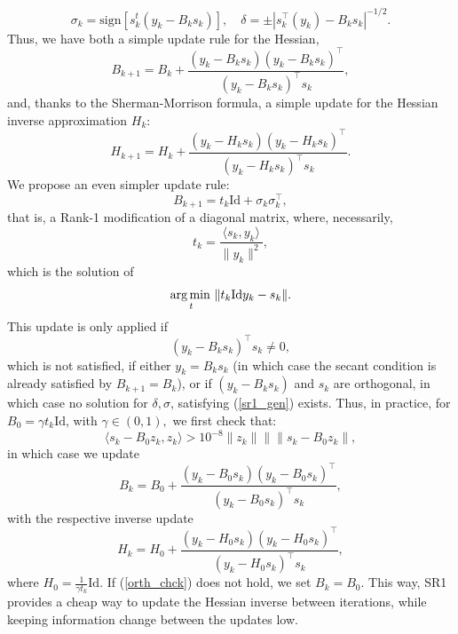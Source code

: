 \documentclass[11pt, twoside]{report}
\begin{document}
\[\sigma_k = \mathrm{sign}[s_k^t(y_k - B_k s_k)], \quad \delta = \pm |s_k^\top (y_k) - B_ks_k|^{-1/2}.\]
Thus, we have both a simple update rule for the Hessian,
\begin{equation} \label{sr1_upd}
    B_{k+1} = B_k + \frac{(y_k - B_ks_k)(y_k - B_ks_k)^\top}{(y_k - B_ks_k)^\top s_k},
\end{equation}
and, thanks to the Sherman-Morrison formula, a simple update for the Hessian inverse approximation $H_k$:
\begin{equation} \label{sr1_upd}
    H_{k+1} = H_k + \frac{(y_k - H_ks_k)(y_k - H_ks_k)^\top}{(y_k - H_ks_k)^\top s_k}.
\end{equation}
We propose an even simpler update rule:
\begin{equation} \label{sr1_poon}
    B_{k+1} = t_k \mathrm{Id} + \sigma_k \sigma_k^\top,
\end{equation}
that is, a Rank-1 modification of a diagonal matrix, where, necessarily,
$$t_k = \frac{\langle s_k, y_k \rangle}{\|y_k\|^2},$$
which is the solution of 
\[\operatorname*{arg\, min \,}_t \|t_k \mathrm{Id} y_k - s_k\|.\]
This update is only applied if 
\[(y_k - B_ks_k)^\top s_k \neq 0,\]
which is not satisfied, if either $y_k = B_k s_k$ (in which case the secant condition is already satisfied by $B_{k+1} = B_k$), or if $(y_k - B_ks_k)$ and $s_k$ are orthogonal, in which case no solution for $\delta, \sigma$, satisfying (\ref{sr1_gen}) exists. Thus, in practice, for $B_0 = \gamma t_k \mathrm{Id}$, with $\gamma \in (0,1),$ we first check that:
\begin{equation} \label{orth_chck}
    \langle s_k - B_0z_k,z_k \rangle > 10^{-8} \|z_k\|\|\|s_k - B_0z_k\|,
\end{equation}
in which case we update
\[B_{k} = B_0 + \frac{(y_k - B_0s_k)(y_k - B_0s_k)^\top}{(y_k - B_0s_k)^\top s_k},\]
with the respective inverse update
\begin{equation*} \label{sr1_new_upd}
    H_{k} = H_0 + \frac{(y_k - H_0s_k)(y_k - H_0s_k)^\top}{(y_k - H_0s_k)^\top s_k},
\end{equation*}
where $H_0 = \frac{1}{\gamma t_k} \mathrm{Id}$. If (\ref{orth_chck}) does not hold, we set $B_{k} = B_0.$ This way, SR1 provides a cheap way to update the Hessian inverse between iterations, while keeping information change between the updates low.
\end{document}
